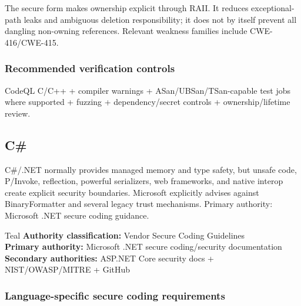 \documentclass[10pt,letterpaper]{article}
\begin{document}
The secure form makes ownership explicit through RAII. It reduces exceptional-path leaks and ambiguous deletion responsibility; it does not by itself prevent all dangling non-owning references. Relevant weakness families include CWE-416/CWE-415.\par
\subsubsection*{Recommended verification controls}
CodeQL C/C++ + compiler warnings + ASan/UBSan/TSan-capable test jobs where supported + fuzzing + dependency/secret controls + ownership/lifetime review.
\clearpage
\subsection{C\#}
C\#/.NET normally provides managed memory and type safety, but unsafe code, P/Invoke, reflection, powerful serializers, web frameworks, and native interop create explicit security boundaries. Microsoft explicitly advises against BinaryFormatter and several legacy trust mechanisms. Primary authority: Microsoft .NET secure coding guidance.
\begin{callout}{Teal}
\textbf{Authority classification:} Vendor Secure Coding Guidelines\\
\textbf{Primary authority:} Microsoft .NET secure coding/security documentation\\
\textbf{Secondary authorities:} ASP.NET Core security docs + NIST/OWASP/MITRE + GitHub
\end{callout}
\subsubsection*{Language-specific secure coding requirements}
\end{document}
